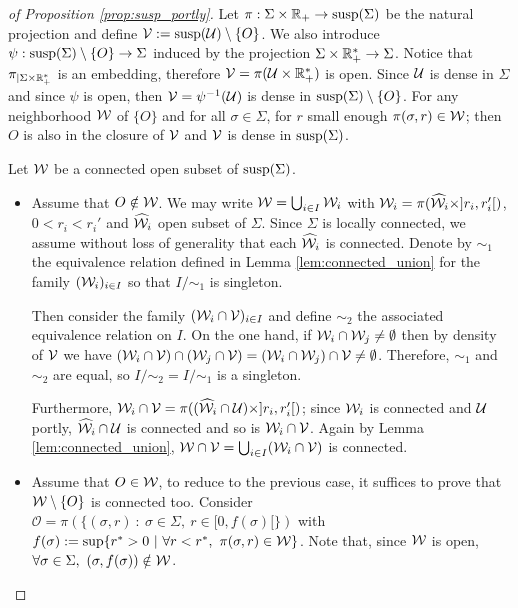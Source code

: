 \begin{proof}[of Proposition \ref{prop:susp_portly}]
 Let $\pi : \Sigma \times \mathbb R_+ \rightarrow \mathrm{susp}(\Sigma)$ be the natural projection and define $\mathcal V := \mathrm{susp}(\mathcal{U})\setminus\{O\}$.  We also introduce $\psi : \mathrm{susp}(\Sigma)\setminus \{O\} \rightarrow \Sigma$ induced by the projection $\Sigma\times \mathbb R_+^* \rightarrow \Sigma$.
 Notice that $\pi_{|\Sigma\times \mathbb R_+^*}$ is an embedding, therefore $\mathcal V = \pi(\mathcal{U}\times \mathbb R_+^*)$ is open.  Since $\mathcal{U}$ is dense in $\Sigma$ and since $\psi$ is open, then $\mathcal V = \psi^{-1}(\mathcal{U})$ is dense in $\mathrm{susp}(\Sigma)\setminus \{O\}$. For any neighborhood $\mathcal W$ of $\{O\}$ and for all $\sigma \in \Sigma$, for $r$ small enough $\pi(\sigma,r)\in \mathcal W$; then $O$ is also in the closure of $\mathcal V$ and $\mathcal V$ is dense in $\mathrm{susp}(\Sigma)$. 
 
 Let $\mathcal W$ be a connected open subset of $\mathrm{susp}(\Sigma)$.
 \begin{itemize}
  \item Assume that $O\notin \mathcal W$. We may write $\mathcal W = \bigcup_{i\in I} \mathcal W_i$ with $\mathcal W_i = \pi(\widehat {\mathcal W}_i\times ]r_i,r_i'[)$, $0<r_i<r_i'$ and $\widehat {\mathcal W}_i$ open subset of $\Sigma$. Since $\Sigma$ is locally connected, we assume without loss of generality that each $\widehat {\mathcal W}_i$ is connected. Denote by $\sim_1$ the  equivalence relation defined in Lemma \ref{lem:connected_union} for the family $(\mathcal W_i)_{i\in I}$ so that $I/\sim_1$ is singleton. 
  
  Then consider the family $(\mathcal W_i\cap \mathcal V)_{i\in I}$ and define $\sim_2$ the associated equivalence relation on $I$. 
 On the one hand, if $\mathcal W_i \cap \mathcal W_j\neq \emptyset$ then by density of $\mathcal V$ 
 we have $(\mathcal W_i\cap \mathcal V) \cap (\mathcal W_j\cap\mathcal V) = (\mathcal W_i\cap \mathcal W_j)\cap \mathcal V \neq \emptyset$. Therefore, $\sim_1$ and $\sim_2$ are equal, so $I/\sim_2=I/
 \sim_1$ is a singleton.
 
 Furthermore, $\mathcal W_i\cap \mathcal V = \pi((\widehat {\mathcal W}_i \cap \mathcal{U}) \times ]r_i,r_i'[)$; since $\mathcal W_i$ is connected and $\mathcal{U}$ portly, $\widehat {\mathcal W}_i\cap \mathcal{U}$ is connected and so is $\mathcal W_i\cap \mathcal V$. Again by Lemma \ref{lem:connected_union}, $\mathcal W\cap \mathcal V = \bigcup_{i\in I} (\mathcal W_i\cap \mathcal V)$ is connected.
 
 \item Assume that $O\in \mathcal W$, to reduce to the previous case, it suffices to prove that $\mathcal W\setminus \{O\}$ is connected too.
 Consider $\mathcal O = \pi(\{(\sigma,r) ~:~ \sigma\in \Sigma,~ r\in [0,f(\sigma)[\})$ with $f(\sigma):=\sup \{r^*>0 ~|~ \forall r<r^*,~\pi(\sigma,r)\in \mathcal W\}$. Note that, since $\mathcal W$ is open, $\forall \sigma \in \Sigma,~ (\sigma,f(\sigma))\notin \mathcal W$. 
 

\end{itemize}
\end{proof}
